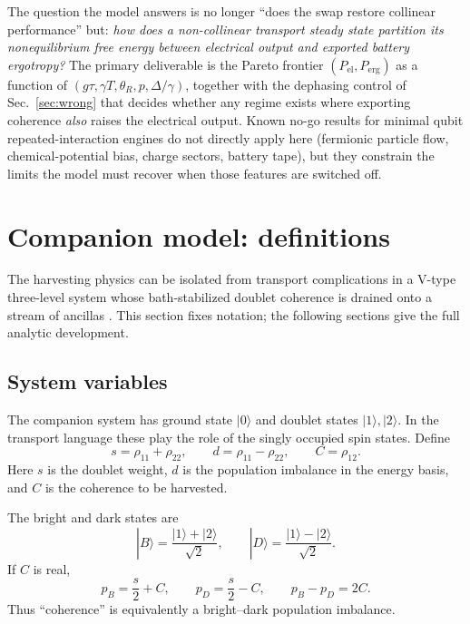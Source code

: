 \documentclass[11pt,a4paper]{article}
\newcommand{\ket}[1]{|#1\rangle}
\begin{document}
The question the model answers is no longer ``does the swap restore collinear performance'' but: \emph{how does a non-collinear transport steady state partition its nonequilibrium free energy between electrical output and exported battery ergotropy?} The primary deliverable is the Pareto frontier $(P_{\mathrm{el}},P_{\mathrm{erg}})$ as a function of $(g\tau,\gamma T,\theta_R,p,\Delta/\gamma)$, together with the dephasing control of Sec.~\ref{sec:wrong} that decides whether any regime exists where exporting coherence \emph{also} raises the electrical output. Known no-go results for minimal qubit repeated-interaction engines \cite{NoGo2026} do not directly apply here (fermionic particle flow, chemical-potential bias, charge sectors, battery tape), but they constrain the limits the model must recover when those features are switched off.

\section{Companion model: definitions}\label{sec:companion}

The harvesting physics can be isolated from transport complications in a V-type three-level system whose bath-stabilized doublet coherence is drained onto a stream of ancillas \cite{Vsystem}. This section fixes notation; the following sections give the full analytic development.

\subsection{System variables}

The companion system has ground state $\ket{0}$ and doublet states $\ket{1},\ket{2}$. In the transport language these play the role of the singly occupied spin states. Define
\begin{equation}
 s=\rho_{11}+\rho_{22},\qquad d=\rho_{11}-\rho_{22},\qquad C=\rho_{12}.
\end{equation}
Here $s$ is the doublet weight, $d$ is the population imbalance in the energy basis, and $C$ is the coherence to be harvested.

The bright and dark states are
\begin{equation}
\ket{B}=\frac{\ket{1}+\ket{2}}{\sqrt2},\qquad
\ket{D}=\frac{\ket{1}-\ket{2}}{\sqrt2}.
\end{equation}
If $C$ is real,
\begin{equation}
 p_B=\frac{s}{2}+C,
 \qquad
 p_D=\frac{s}{2}-C,
 \qquad
 p_B-p_D=2C.
\end{equation}
Thus ``coherence'' is equivalently a bright--dark population imbalance.
\end{document}
